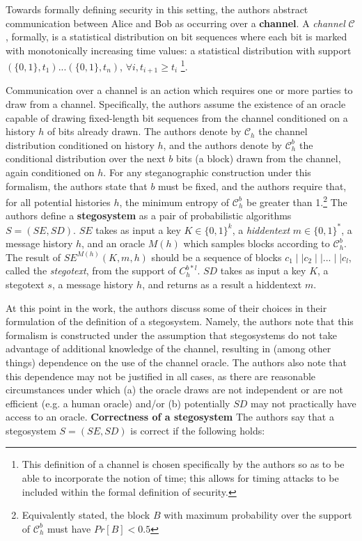 \documentclass{article}
\begin{document}
Towards formally defining security in this setting, the authors abstract communication between Alice and 
Bob as occurring over a \textbf{channel}.  A \textit{channel} $\mathcal{C}$, formally, is a statistical distribution on bit sequences where each bit is marked with monotonically increasing time values: a statistical distribution with 
support $(\{0,1\}, t_1) ... (\{0,1\}, t_n)$, $\forall i, t_{i+1} \geq t_i$ \footnote{This definition 
of a channel is chosen specifically by the authors so as to be able to incorporate the notion of time; this 
allows for timing attacks to be included within the formal definition of security.}.

Communication over a channel is an action which requires one or more parties to draw from a channel.  Specifically, 
the authors assume the existence of an oracle capable of drawing fixed-length bit sequences from the channel conditioned on a history $h$ of bits already drawn.  The authors denote by $\mathcal{C}_h$ the channel distribution conditioned on history $h$, and the authors denote by $\mathcal{C}_h^{b}$ the conditional distribution over the next $b$ bits (a block) drawn from the channel, again conditioned on $h$.  For any steganographic construction under this formalism, the authors 
state that $b$ must be fixed, and the authors require that, for all potential histories $h$, the minimum entropy 
of $\mathcal{C}_h^{b}$ be greater than 1.\footnote{Equivalently stated, the block $B$ with maximum probability over the 
support of $\mathcal{C}_h^{b}$ must have $Pr[B] < 0.5$}
\newline\newline
The authors define a \textbf{stegosystem} as a pair of probabilistic algorithms $S = (SE, SD)$.  $SE$ takes 
as input a key $K \in \{0,1\}^k$, a \textit{hiddentext} $m \in \{0,1\}^*$, a message history $h$, and an 
oracle $M(h)$ which samples blocks according to $\mathcal{C}_h^{b}$.  The result of $SE^{M(h)}(K, m, h)$ should 
be a sequence of blocks $c_1 \mid\mid c_2 \mid\mid ... \mid\mid c_l$, called the \textit{stegotext}, from the support 
of $C_h^{b*l}$.  $SD$ takes as input a key $K$, a stegotext $s$, a message history $h$, and returns as a 
result a hiddentext $m$.

At this point in the work, the authors discuss some of their choices in their formulation of the 
definition of a stegosystem.  Namely, the authors note that this formalism is constructed 
under the assumption that stegosystems do not take advantage of additional knowledge of the channel, resulting 
in (among other things) dependence on the use of the channel oracle.  The authors also note that 
this dependence may not be justified in all cases, as there are reasonable circumstances under which 
(a) the oracle draws are not independent or are not efficient (e.g. a human oracle) and/or (b) potentially 
$SD$ may not practically have access to an oracle.
\newline\newline
\noindent \textbf{Correctness of a stegosystem } The authors say that a stegosystem $S = (SE, SD)$ is correct if the following holds:
\end{document}
